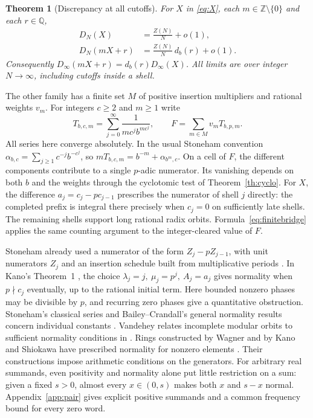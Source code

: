 \documentclass[11pt]{article}
\newtheorem{theorem}{Theorem}
\newcommand{\Z}{\mathbb Z}
\newcommand{\Q}{\mathbb Q}
\begin{document}
\begin{theorem}[Discrepancy at all cutoffs]\label{th:shell}
For \(X\) in \eqref{eq:X}, each \(m\in\Z\setminus\{0\}\) and each \(r\in\Q\),
\begin{align}
 D_N(X)&=\frac{Z(N)}{N}+o(1),\label{eq:all}\\
 D_N(mX+r)&=\frac{Z(N)}{N}\,d_b(r)+o(1).\label{eq:translate}
\end{align}
Consequently \(D_\infty(mX+r)=d_b(r)D_\infty(X)\). All limits are over integer \(N\to\infty\), including cutoffs inside a shell.
\end{theorem}

The other family has a finite set \(M\) of positive insertion multipliers and rational weights \(v_m\). For integers \(c\ge2\) and \(m\ge1\) write
\begin{equation}\label{eq:F}
 T_{b,c,m}=\sum_{j=0}^\infty\frac{1}{m c^j b^{m c^j}},
 \qquad F=\sum_{m\in M}v_mT_{b,p,m}.
\end{equation}
All series here converge absolutely. In the usual Stoneham convention \(\alpha_{b,c}=\sum_{j\ge1}c^{-j}b^{-c^j}\), so \(mT_{b,c,m}=b^{-m}+\alpha_{b^m,c}\). On a cell of \(F\), the different components contribute to a single \(p\)-adic
numerator. Its vanishing depends on both \(b\) and the weights through the
cyclotomic test of Theorem~\ref{th:cyclo}. For \(X\), the difference
\(a_j=c_j-pc_{j-1}\) prescribes the numerator of shell \(j\) directly:
the completed prefix is integral there precisely when \(c_j=0\) on
sufficiently late shells. The remaining shells support long rational radix
orbits. Formula~\eqref{eq:finitebridge} applies the same counting argument
to the integer-cleared value of \(F\).

Stoneham already used a numerator of the form \(Z_j-pZ_{j-1}\), with unit numerators \(Z_j\) and an insertion schedule built from multiplicative periods \cite{stoneham70,kano}. In Kano's Theorem~1 \cite{kano}, the choice \(\lambda_j=j,\ \mu_j=p^j,\ A_j=a_j\) gives normality when \(p\nmid c_j\) eventually, up to the rational initial term. Here bounded nonzero phases may be divisible by \(p\), and recurring zero phases give a quantitative obstruction. Stoneham's classical series and Bailey--Crandall's general normality results concern individual constants \cite{stoneham,bc}. Vandehey relates incomplete modular orbits to sufficient normality conditions in \cite[\S7]{vandehey}. Rings constructed by Wagner and by Kano and Shiokawa have prescribed normality for nonzero elements \cite{wagner,ks}. Their constructions impose arithmetic conditions on the generators. For arbitrary real summands, even positivity and normality alone put little restriction on a sum: given a fixed \(s>0\), almost every \(x\in(0,s)\) makes both \(x\) and \(s-x\) normal. Appendix~\ref{app:pair} gives explicit positive summands and a common frequency bound for every zero word.
\end{document}
